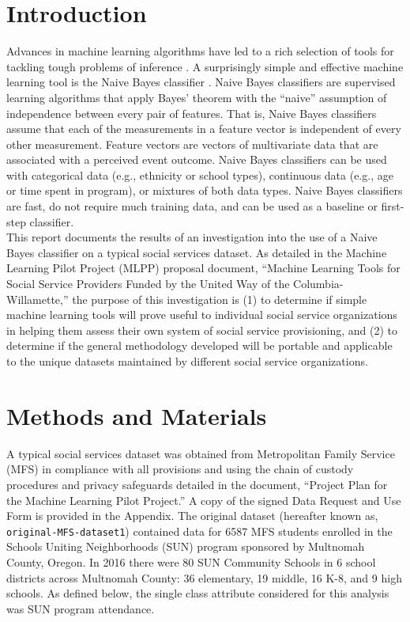 \documentclass[twoside]{article}	%
\begin{document}
\section{Introduction}
Advances in machine learning algorithms have led to a rich selection of tools for tackling tough problems of inference . A surprisingly simple and effective machine learning tool is the Naive Bayes classifier . Naive Bayes classifiers are supervised learning algorithms that apply Bayes' theorem with the \enquote{naive} assumption of independence between every pair of features. That is, Naive Bayes classifiers assume that each of the measurements in a feature vector is independent of every other measurement. Feature vectors are vectors of multivariate data that are associated with a perceived event outcome. Naive Bayes classifiers can be used with categorical data (e.g., ethnicity or school types), continuous data (e.g., age or time spent in program), or mixtures of both data types. Naive Bayes classifiers are fast, do not require much training data, and can be used as a baseline or first-step classifier.\\

\noindent This report documents the results of an investigation into the use of a Naive Bayes classifier on a typical social services dataset. As detailed in the Machine Learning Pilot Project (MLPP) proposal document, \enquote{Machine Learning Tools for Social Service Providers Funded by the United Way of the Columbia-Willamette,} the purpose of this investigation is (1) to determine if simple machine learning tools will prove useful to individual social service organizations in helping them assess their own system of social service provisioning, and (2) to determine if the general methodology developed will be portable and applicable to the unique datasets maintained by different social service organizations.

\section{Methods and Materials}
A typical social services dataset was obtained from Metropolitan Family Service (MFS) in compliance with all provisions and using the chain of custody procedures and privacy safeguards detailed in the document, \enquote{Project Plan for the Machine Learning Pilot Project.} A copy of the signed Data Request and Use Form is provided in the Appendix. The original dataset (hereafter known as, \texttt{original-MFS-dataset1}) contained data for 6587 MFS students enrolled in the Schools Uniting Neighborhoods (SUN) program sponsored by Multnomah County, Oregon. In 2016 there were 80 SUN Community Schools in 6 school districts across Multnomah County: 36 elementary, 19 middle, 16 K-8, and 9 high schools. As defined below, the single class attribute considered for this analysis was SUN program attendance.\\
\end{document}
